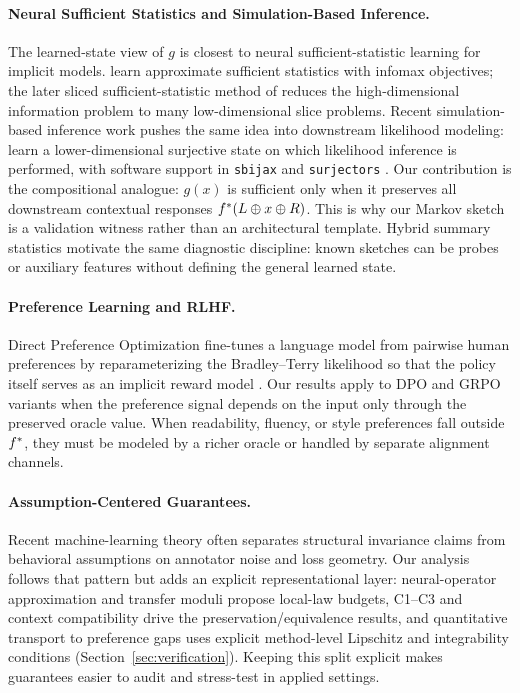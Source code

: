 \paragraph{Neural Sufficient Statistics and Simulation-Based Inference.}
The learned-state view of $g$ is closest to neural sufficient-statistic
learning for implicit models. \citet{ChenEtAl2021NASS} learn
approximate sufficient statistics with infomax objectives; the later
sliced sufficient-statistic method of \citet{ChenGutmannWeller2023SSS}
reduces the high-dimensional information problem to many
low-dimensional slice problems. Recent simulation-based inference work
pushes the same idea into downstream likelihood modeling:
\citet{DirmeierAlbertPerezCruz2025SSNL} learn a lower-dimensional
surjective state on which likelihood inference is performed, with
software support in \texttt{sbijax} and \texttt{surjectors}
\citep{DirmeierUlzegaMiraAlbert2024SBIJAX,Dirmeier2024Surjectors}.
Our contribution is the compositional analogue: $g(x)$ is sufficient
only when it preserves all downstream contextual responses
$f^\ast(L \oplus x \oplus R)$. This is why our Markov sketch is a
validation witness rather than an architectural template. Hybrid summary
statistics \citep{MakinenEtAl2024HybridSummaryStatistics} motivate the
same diagnostic discipline: known sketches can be probes or auxiliary
features without defining the general learned state.

\paragraph{Preference Learning and RLHF.}
Direct Preference Optimization fine-tunes a language model from pairwise
human preferences by reparameterizing the Bradley--Terry likelihood so
that the policy itself serves as an implicit reward model
\citep{BradleyTerry1952,RafailovEtAl2023DPO}. Our results apply to DPO
and GRPO variants when the preference signal depends on the input only
through the preserved oracle value. When readability, fluency, or style
preferences fall outside $f^\ast$, they must be modeled by a richer
oracle or handled by separate alignment channels.

\paragraph{Assumption-Centered Guarantees.}
Recent machine-learning theory often separates structural invariance
claims from behavioral assumptions on annotator noise and loss geometry.
Our analysis follows that pattern but adds an explicit representational
layer: neural-operator approximation and transfer moduli propose
local-law budgets, C1--C3 and context compatibility drive the
preservation/equivalence results, and quantitative transport to
preference gaps uses explicit method-level Lipschitz and integrability
conditions (Section~\ref{sec:verification}). Keeping this split explicit
makes guarantees easier to audit and stress-test in applied settings.
